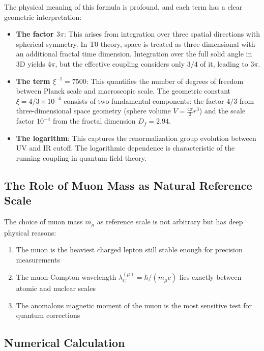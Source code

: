 \documentclass[12pt,a4paper]{article}
\theoremstyle{definition}
\begin{document}
	The physical meaning of this formula is profound, and each term has a clear geometric interpretation:
	
	\begin{itemize}
		\item \textbf{The factor $3\pi$}: This arises from integration over three spatial directions with spherical symmetry. In T0 theory, space is treated as three-dimensional with an additional fractal time dimension. Integration over the full solid angle in 3D yields $4\pi$, but the effective coupling considers only $3/4$ of it, leading to $3\pi$.
		
		\item \textbf{The term $\xi^{-1} = 7500$}: This quantifies the number of degrees of freedom between Planck scale and macroscopic scale. The geometric constant $\xi = 4/3 \times 10^{-4}$ consists of two fundamental components: the factor $4/3$ from three-dimensional space geometry (sphere volume $V = \frac{4\pi}{3}r^3$) and the scale factor $10^{-4}$ from the fractal dimension $D_f = 2.94$.
		
		\item \textbf{The logarithm}: This captures the renormalization group evolution between UV and IR cutoff. The logarithmic dependence is characteristic of the running coupling in quantum field theory.
	\end{itemize}
	
	\subsection{The Role of Muon Mass as Natural Reference Scale}
	
	The choice of muon mass $m_{\mu}$ as reference scale is not arbitrary but has deep physical reasons:
	
	\begin{enumerate}
		\item The muon is the heaviest charged lepton still stable enough for precision measurements
		\item The muon Compton wavelength $\lambda_C^{(\mu)} = \hbar/(m_\mu c)$ lies exactly between atomic and nuclear scales
		\item The anomalous magnetic moment of the muon is the most sensitive test for quantum corrections
	\end{enumerate}
	
	\subsection{Numerical Calculation}
	
\end{document}
